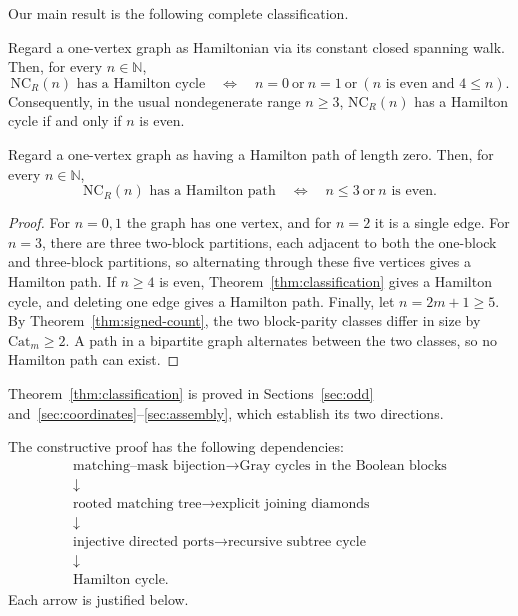 \documentclass[12pt]{article}
\newcommand{\NCR}{\mathrm{NC}_R}
\newcommand{\catalan}{\mathrm{Cat}}
\begin{document}
Our main result is the following complete classification.

\begin{theorem}\label{thm:classification}
Regard a one-vertex graph as Hamiltonian via its constant closed spanning
walk.  Then, for every $n\in\mathbb N$,
\[
 \NCR(n)\text{ has a Hamilton cycle}
 \quad\Longleftrightarrow\quad
 n=0\ \text{or}\ n=1\ \text{or}\
 (n\text{ is even and }4\leq n).
\]
Consequently, in the usual nondegenerate range $n\geq3$, $\NCR(n)$ has a
Hamilton cycle if and only if $n$ is even.
\end{theorem}

\begin{corollary}\label{cor:hamilton-paths}
Regard a one-vertex graph as having a Hamilton path of length zero.  Then, for
every $n\in\mathbb N$,
\[
 \NCR(n)\text{ has a Hamilton path}
 \quad\Longleftrightarrow\quad
 n\leq3\ \text{or}\ n\text{ is even}.
\]
\end{corollary}

\begin{proof}
For $n=0,1$ the graph has one vertex, and for $n=2$ it is a single edge.  For
$n=3$, there are three two-block partitions, each adjacent to both the
one-block and three-block partitions, so alternating through these five
vertices gives a Hamilton path.  If
$n\geq4$ is even, Theorem~\ref{thm:classification} gives a Hamilton cycle,
and deleting one edge gives a Hamilton path.  Finally, let $n=2m+1\geq5$.
By Theorem~\ref{thm:signed-count}, the two block-parity classes differ in
size by $\catalan_m\geq2$.  A path in a bipartite graph alternates between
the two classes, so no Hamilton path can exist.
\end{proof}

Theorem~\ref{thm:classification} is proved in Sections~\ref{sec:odd}
and~\ref{sec:coordinates}--\ref{sec:assembly}, which establish its two
directions.

The constructive proof has the following dependencies:
\[
\begin{array}{c}
\text{matching--mask bijection}
\longrightarrow \text{Gray cycles in the Boolean blocks}\\[-1pt]
\downarrow\\[-1pt]
\text{rooted matching tree}
\longrightarrow \text{explicit joining diamonds}\\[-1pt]
\downarrow\\[-1pt]
\text{injective directed ports}
\longrightarrow \text{recursive subtree cycle}\\[-1pt]
\downarrow\\[-1pt]
\text{Hamilton cycle}.
\end{array}
\]
Each arrow is justified below.
\end{document}

